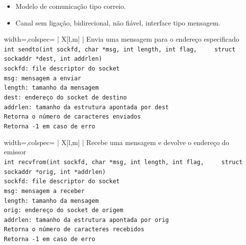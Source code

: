 \documentclass[11pt]{article}
\begin{document}
\begin{itemize}
    \item Modelo de comunicação tipo correio.
    \item Canal sem ligação, bidirecional, não fiável, interface tipo mensagem.
\end{itemize}

\begin{tblr}{width=\linewidth,colspec={ | X[l,m] | }}
    \hline
    \centering Envia uma mensagem para o endereço especificado  \\\hline
    \lstinline|int sendto(int sockfd, char *msg, int length, int flag,
    struct sockaddr *dest, int addrlen)|                        \\\hline
    \lstinline|sockfd: file descriptor do socket|               \\
    \lstinline|msg: mensagem a enviar|                          \\
    \lstinline|length: tamanho da mensagem|                     \\
    \lstinline|dest: endereço do socket de destino|             \\
    \lstinline|addrlen: tamanho da estrutura apontada por dest| \\\hline
    \lstinline|Retorna o número de caracteres enviados|         \\
    \lstinline|Retorna -1 em caso de erro|                      \\\hline
\end{tblr}

\begin{tblr}{width=\linewidth,colspec={ | X[l,m] | }}
    \hline
    \centering Recebe uma mensagem e devolve o endereço do emissor \\\hline
    \lstinline|int recvfrom(int sockfd, char *msg, int length, int flag,
    struct sockaddr *orig, int *addrlen)|                          \\\hline
    \lstinline|sockfd: file descriptor do socket|                  \\
    \lstinline|msg: mensagem a receber|                            \\
    \lstinline|length: tamanho da mensagem|                        \\
    \lstinline|orig: endereço do socket de origem|                 \\
    \lstinline|addrlen: tamanho da estrutura apontada por orig|    \\\hline
    \lstinline|Retorna o número de caracteres recebidos|           \\
    \lstinline|Retorna -1 em caso de erro|                         \\\hline
\end{tblr}
\end{document}
